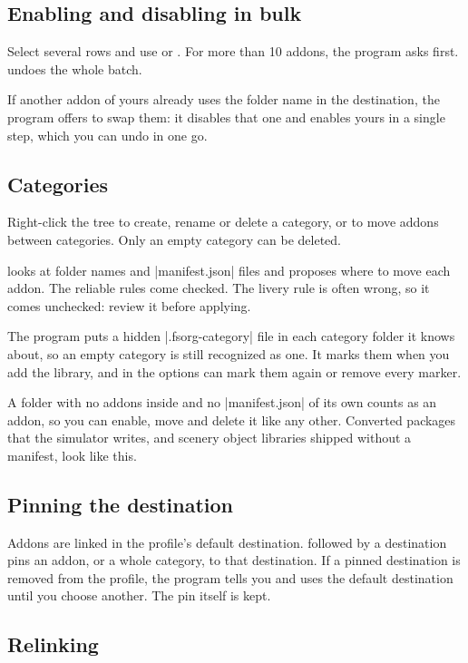 \documentclass[11pt,a4paper]{article}
\begin{document}
\subsection{Enabling and disabling in bulk}

Select several rows and use  or . For
more than 10 addons, the program asks first.  undoes the
whole batch.

If another addon of yours already uses the folder name in the destination, the
program offers to swap them: it disables that one and enables yours in a single
step, which you can undo in one go.

\subsection{Categories}

Right-click the tree to create, rename or delete a category, or to move addons
between categories. Only an empty category can be deleted.

 looks at folder names and \where|manifest.json| files
and proposes where to move each addon. The reliable rules come checked. The
livery rule is often wrong, so it comes unchecked: review it before applying.

The program puts a hidden \where|.fsorg-category| file in each category folder
it knows about, so an empty category is still recognized as one. It marks them
when you add the library, and  in the options can mark them
again or remove every marker.

A folder with no addons inside and no \where|manifest.json| of its own counts as
an addon, so you can enable, move and delete it like any other. Converted
packages that the simulator writes, and scenery object libraries shipped
without a manifest, look like this.

\subsection{Pinning the destination}

Addons are linked in the profile's default destination. 
followed by a destination pins an addon, or a whole category, to that
destination. If a pinned destination is removed from the profile, the program
tells you and uses the default destination until you choose another. The pin
itself is kept.

\subsection{Relinking}
\end{document}
